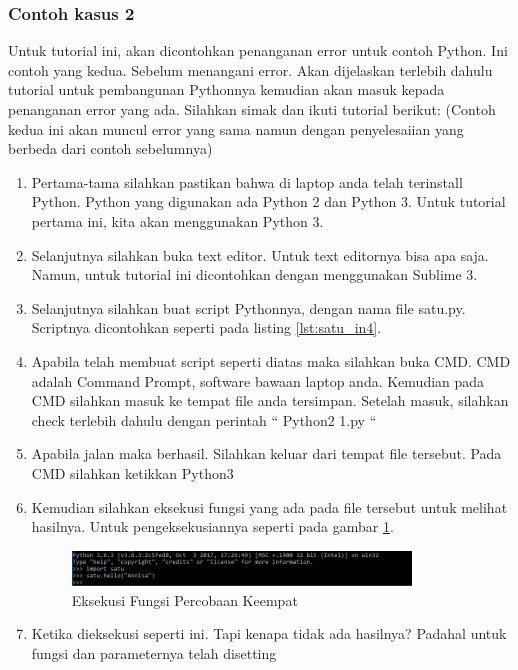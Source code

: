 \subsubsection{Contoh kasus 2}
Untuk tutorial ini, akan dicontohkan penanganan error untuk contoh Python. Ini contoh yang kedua. Sebelum menangani error. Akan dijelaskan terlebih dahulu tutorial untuk pembangunan Pythonnya kemudian akan masuk kepada penanganan error yang ada. Silahkan simak dan ikuti tutorial berikut: 
(Contoh kedua ini akan muncul error yang sama namun dengan penyelesaiian yang berbeda dari contoh sebelumnya)
\begin{enumerate}
\item Pertama-tama silahkan pastikan bahwa di laptop anda telah terinstall Python. Python yang digunakan ada Python 2 dan Python 3. Untuk tutorial pertama ini, kita akan menggunakan Python 3.
\item Selanjutnya silahkan buka text editor. Untuk text editornya bisa apa saja. Namun, untuk tutorial ini dicontohkan dengan menggunakan Sublime 3.
\item Selanjutnya silahkan buat script Pythonnya, dengan nama file satu.py. Scriptnya dicontohkan seperti pada listing \ref{lst:satu_in4}.

\item Apabila telah membuat script seperti diatas maka silahkan buka CMD. CMD adalah Command Prompt, software bawaan laptop anda. Kemudian pada CMD silahkan masuk ke tempat file anda tersimpan. Setelah masuk, silahkan check terlebih dahulu dengan perintah “ Python2 1.py “
\item Apabila jalan maka berhasil. Silahkan keluar dari tempat file tersebut. Pada CMD silahkan ketikkan Python3
\item Kemudian silahkan eksekusi fungsi yang ada pada file tersebut untuk melihat hasilnya. Untuk pengeksekusiannya seperti pada gambar \ref{fig:eksekusi_fungsi4}.
\begin{figure}[!htbp]
	\centerline{\includegraphics[width=0.85\textwidth]{figures/8/eksekusi_fungsi4.png}}
	\caption{Eksekusi Fungsi Percobaan Keempat}
	\label{fig:eksekusi_fungsi4}
\end{figure}
\item Ketika dieksekusi seperti ini. Tapi kenapa tidak ada hasilnya? Padahal untuk fungsi dan parameternya telah disetting

\end{enumerate}
